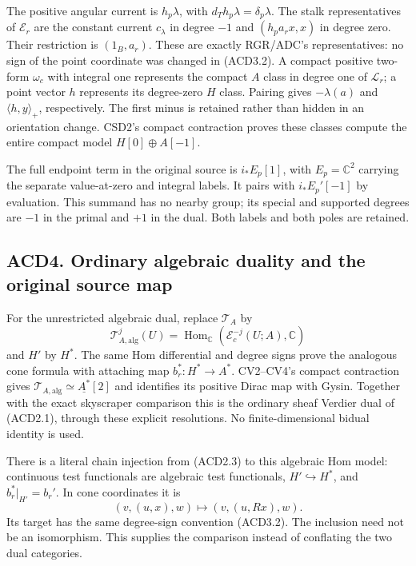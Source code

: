 The positive angular current is \(h_p\lambda\), with
\(d_Th_p\lambda=\delta_p\lambda\). The stalk representatives of
\(\mathscr E_r\) are the constant current \(c_\lambda\) in degree \(-1\)
and \((h_pa_rx,x)\) in degree zero. Their restriction is \((1_B,a_r)\).
These are exactly RGR/ADC's representatives: no sign of the point
coordinate was changed in (ACD3.2). A compact positive two-form
\(\omega_c\) with integral one represents the compact \(A\) class in
degree one of \(\mathscr L_r\); a point vector \(h\) represents its
degree-zero \(H\) class. Pairing gives \(-\lambda(a)\) and
\(\langle h,y\rangle_+\), respectively. The first minus is retained
rather than hidden in an orientation change. CSD2's compact contraction
proves these classes compute the entire compact model
\(H[0]\oplus A[-1]\).

The full endpoint term in the original source is \(i_*E_p[1]\), with
\(E_p=\mathbb C^2\) carrying the separate value-at-zero and integral
labels. It pairs with \(i_*E_p'[-1]\) by evaluation. This summand has no
nearby group; its special and supported degrees are \(-1\) in the primal
and \(+1\) in the dual. Both labels and both poles are retained.

\subsection{ACD4. Ordinary algebraic duality and the original source
map}\label{acd4.-ordinary-algebraic-duality-and-the-original-source-map}

For the unrestricted algebraic dual, replace \(\mathscr T_A\) by \[
\mathscr T_{A,\mathrm{alg}}^j(U)
=\operatorname{Hom}_{\mathbb C}(\mathscr E_c^{-j}(U;A),\mathbb C)
\tag{ACD4.1}
\] and \(H'\) by \(H^*\). The same Hom differential and degree signs
prove the analogous cone formula with attaching map
\(b_r^*:H^*\to A^*\). CV2--CV4's compact contraction gives
\(\mathscr T_{A,\mathrm{alg}}\simeq\underline{A^*}[2]\) and identifies
its positive Dirac map with Gysin. Together with the exact skyscraper
comparison this is the ordinary sheaf Verdier dual of (ACD2.1), through
these explicit resolutions. No finite-dimensional bidual identity is
used.

There is a literal chain injection from (ACD2.3) to this algebraic Hom
model: continuous test functionals are algebraic test functionals,
\(H'\hookrightarrow H^*\), and \(b_r^*\vert_{H'}=b_r'\). In cone
coordinates it is \[
(v,(u,x),w)\longmapsto
(v,(u,Rx),w).
\tag{ACD4.2}
\] Its target has the same degree-sign convention (ACD3.2). The
inclusion need not be an isomorphism. This supplies the comparison
instead of conflating the two dual categories.


